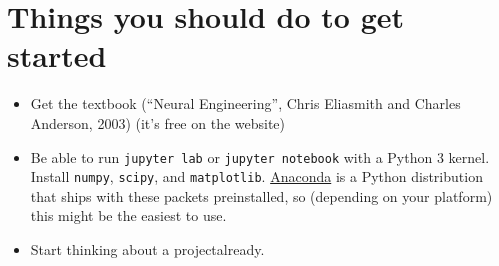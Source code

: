 \documentclass[10pt,letterpaper,oneside]{article}
\begin{document}
\newpage

\section{Things you should do to get started}

\begin{itemize}
	\item Get the textbook (\enquote{Neural Engineering}, Chris Eliasmith and Charles Anderson, 2003) (it's free on the website)
	\item Be able to run \texttt{jupyter lab} or \texttt{jupyter notebook} with a Python 3 kernel. Install \texttt{numpy}, \texttt{scipy}, and \texttt{matplotlib}. \href{https://www.anaconda.com/distribution/}{Anaconda} is a Python distribution that ships with these packets preinstalled, so (depending on your platform) this might be the easiest to use.
	\item Start thinking about a project\textellipsis already.
\end{itemize}

\printbibliography
\end{document}
